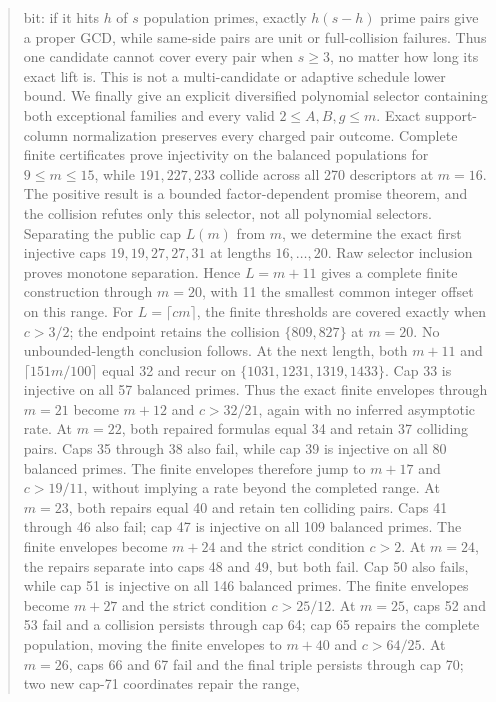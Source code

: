\documentclass[11pt]{article}
\begin{document}
\begin{abstract}
bit: if it hits \(h\) of \(s\) population primes, exactly \(h(s-h)\) prime
pairs give a proper GCD, while same-side pairs are unit or full-collision
failures. Thus one candidate cannot cover every pair when \(s\ge3\), no
matter how long its exact lift is. This is not a multi-candidate or adaptive
schedule lower bound.
We finally give an explicit diversified polynomial selector containing both
exceptional families and every valid \(2\le A,B,g\le m\). Exact support-column
normalization preserves every charged pair outcome. Complete finite
certificates prove injectivity on the balanced populations for
\(9\le m\le15\), while \(191,227,233\) collide across all 270 descriptors at
\(m=16\). The positive result is a bounded factor-dependent promise theorem,
and the collision refutes only this selector, not all polynomial selectors.
Separating the public cap \(L(m)\) from \(m\), we determine the exact first
injective caps \(19,19,27,27,31\) at lengths \(16,\ldots,20\). Raw selector
inclusion proves monotone separation. Hence \(L=m+11\) gives a complete
finite construction through \(m=20\), with 11 the smallest common integer
offset on this range. For \(L=\lceil cm\rceil\), the finite thresholds are
covered exactly when \(c>3/2\); the endpoint retains the collision
\(\{809,827\}\) at \(m=20\). No unbounded-length conclusion follows.
At the next length, both \(m+11\) and \(\lceil151m/100\rceil\) equal 32
and recur on \(\{1031,1231,1319,1433\}\). Cap 33 is injective on all 57
balanced primes. Thus the exact finite envelopes through \(m=21\) become
\(m+12\) and \(c>32/21\), again with no inferred asymptotic rate.
At \(m=22\), both repaired formulas equal 34 and retain 37 colliding pairs.
Caps 35 through 38 also fail, while cap 39 is injective on all 80 balanced
primes. The finite envelopes therefore jump to \(m+17\) and \(c>19/11\),
without implying a rate beyond the completed range.
At \(m=23\), both repairs equal 40 and retain ten colliding pairs. Caps 41
through 46 also fail; cap 47 is injective on all 109 balanced primes. The
finite envelopes become \(m+24\) and the strict condition \(c>2\).
At \(m=24\), the repairs separate into caps 48 and 49, but both fail. Cap 50
also fails, while cap 51 is injective on all 146 balanced primes. The finite
envelopes become \(m+27\) and the strict condition \(c>25/12\).
At \(m=25\), caps 52 and 53 fail and a collision persists through cap 64;
cap 65 repairs the complete population, moving the finite envelopes to
\(m+40\) and \(c>64/25\). At \(m=26\), caps 66 and 67 fail and the final
triple persists through cap 70; two new cap-71 coordinates repair the range,

\end{abstract}
\end{document}
